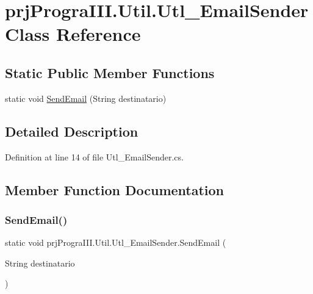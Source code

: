 \hypertarget{classprj_progra_i_i_i_1_1_util_1_1_utl___email_sender}{}\section{prj\+Progra\+I\+I\+I.\+Util.\+Utl\+\_\+\+Email\+Sender Class Reference}
\label{classprj_progra_i_i_i_1_1_util_1_1_utl___email_sender}
\subsection*{Static Public Member Functions}
\begin{DoxyCompactItemize}
\item 
static void \hyperlink{classprj_progra_i_i_i_1_1_util_1_1_utl___email_sender_ab95747aa262d37b41440536d14f40d29}{Send\+Email} (String destinatario)
\end{DoxyCompactItemize}


\subsection{Detailed Description}


Definition at line 14 of file Utl\+\_\+\+Email\+Sender.\+cs.



\subsection{Member Function Documentation}
\hypertarget{classprj_progra_i_i_i_1_1_util_1_1_utl___email_sender_ab95747aa262d37b41440536d14f40d29}{}\label{classprj_progra_i_i_i_1_1_util_1_1_utl___email_sender_ab95747aa262d37b41440536d14f40d29} 
\subsubsection{\texorpdfstring{Send\+Email()}{SendEmail()}}
{\footnotesize\ttfamily static void prj\+Progra\+I\+I\+I.\+Util.\+Utl\+\_\+\+Email\+Sender.\+Send\+Email (\begin{DoxyParamCaption}\item[{String}]{destinatario }\end{DoxyParamCaption})\hspace{0.3cm}{\ttfamily [static]}}



